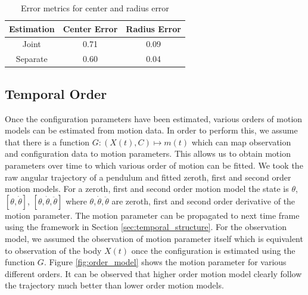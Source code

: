 \documentclass[conference]{IEEEtran}
\begin{document}
\begin{table}
\center
\begin{tabular}{| c | c| c| }
\hline
  Estimation & Center Error & Radius Error\\ \hline
  Joint & 0.71 & 0.09 \\ \hline
  Separate & 0.60 & 0.04 \\ \hline
\end{tabular}
\caption{Error metrics for center and radius error}
\label{tab:error_joint_vs_separate}
\end{table}

\subsection{Temporal Order} Once the configuration parameters have been estimated, various orders of motion models can be estimated from motion data. In order to perform this, we assume that there is a function $G: (X(t),C) \mapsto m(t) $ which can map observation and configuration data to motion parameters. This allows us to obtain motion parameters over time to which various order of motion can be fitted. We took the raw angular trajectory of a pendulum and fitted zeroth, first and second order motion models. For a zeroth, first and second order motion model the state is $\theta$, $[\theta,\dot{\theta}]$, $[\theta,\dot{\theta},\ddot{\theta}]$ where $\theta,\dot{\theta},\ddot{\theta}$ are zeroth, first and second order derivative of the motion parameter. The motion parameter can be propagated to next time frame using the framework in Section \ref{sec:temporal_structure}. For the observation model, we assumed the observation of motion parameter itself which is equivalent to observation of the body $X(t)$ once the configuration is estimated using the function $G$. Figure \ref{fig:order_model} shows the motion parameter for various different orders. It can be observed that higher order motion model clearly follow the trajectory much better than lower order motion models.
\end{document}

